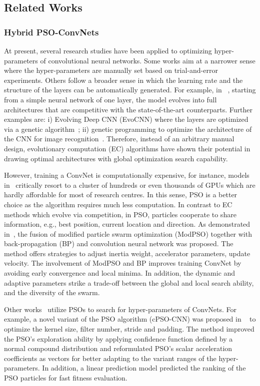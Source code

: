 \documentclass{ieeeaccess}
\begin{document}
\subsection{Related Works}
\subsubsection{Hybrid PSO-ConvNets}
At present, several research studies have been applied to optimizing hyper-parameters of convolutional neural networks. Some works aim at a narrower sense where the hyper-parameters are manually set based on trial-and-error experiments. Others follow a broader sense in which the learning rate and the structure of the layers can be automatically generated. For example, in ~\cite{real2017large}, starting from a simple neural network of one layer, the model evolves into full architectures that are competitive with the state-of-the-art counterparts. Further examples are: i) Evolving Deep CNN (EvoCNN) where the layers are optimized via a genetic algorithm~\cite{sun2019evolving}; ii) genetic programming to optimize the architecture of the CNN for image recognition~\cite{suganuma2017genetic}. Therefore, instead of an arbitrary manual design, evolutionary computation (EC) algorithms have shown their potential in drawing optimal architectures with global optimization search capability.

However, training a ConvNet is computationally expensive, for instance, models in~\cite{real2017large,real2019regularized} critically resort to a cluster of hundreds or even thousands of GPUs which are hardly affordable for most of research centres. In this sense, PSO is a better choice as the algorithm requires much less computation. In contrast to EC methods which evolve via competition, in PSO, particles cooperate to share information, e.g., best position, current location and direction. As demonstrated in~\cite{tu2021modpso}, the fusion of modified particle swarm optimization (ModPSO) together with back-propagation (BP) and convolution neural network was proposed. The method offers strategies to adjust inertia weight, accelerator parameters, update velocity. The involvement of ModPSO and BP improves training ConvNet by avoiding early convergence and local minima. In addition, the dynamic and adaptive parameters strike a trade-off between the global and local search ability, and the diversity of the swarm.

Other works~\cite{wang2019cpso,da2018convolutional} utilize PSOs to search for hyper-parameters of ConvNets. For example, a novel variant of the PSO algorithm (cPSO-CNN) was proposed in ~\cite{wang2019cpso} to optimize the kernel size, filter number, stride and padding. The method improved the PSO’s exploration ability by applying confidence function defined by a normal compound distribution and reformulated PSO’s scalar acceleration coefficients as vectors for better adapting to the variant ranges of the hyper-parameters. In addition, a linear prediction model predicted the ranking of the PSO particles for fast fitness evaluation.
\end{document}
